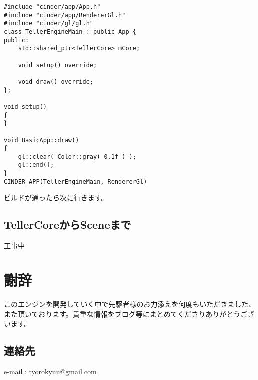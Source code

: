 \documentclass[12pt,a4paper,uplatex,dvipdfmx]{jsarticle}
\begin{document}
\begin{lstlisting}[caption=hoge,label=fuga]
#include "cinder/app/App.h"
#include "cinder/app/RendererGl.h"
#include "cinder/gl/gl.h"
class TellerEngineMain : public App {
public:
	std::shared_ptr<TellerCore> mCore;

	void setup() override;

	void draw() override;
};

void setup()
{
}

void BasicApp::draw()
{
	gl::clear( Color::gray( 0.1f ) );
	gl::end();
}
CINDER_APP(TellerEngineMain, RendererGl)
\end{lstlisting}

ビルドが通ったら次に行きます。
\subsection{TellerCoreからSceneまで}

\Large{工事中}
\normalsize

\section{}

\newpage
\appendix
\section*{謝辞}
このエンジンを開発していく中で先駆者様のお力添えを何度もいただきました、また頂いております。貴重な情報をブログ等にまとめてくださりありがとうございます。

\subsection*{連絡先}
e-mail : tyorokyuu@gmail.com
\end{document}
